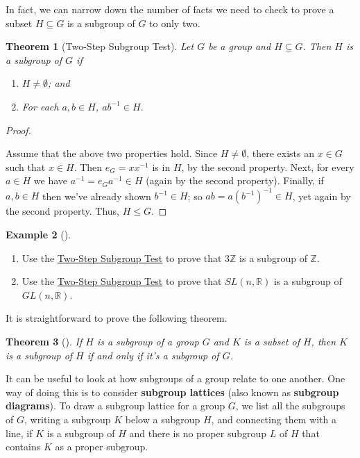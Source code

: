 \documentclass[10pt,]{book}
\newcommand{\terminology}[1]{\textbf{#1}}
\theoremstyle{plain}
\newtheorem{theorem}{Theorem}[section]
\theoremstyle{definition}
\theoremstyle{definition}
\theoremstyle{definition}
\newtheorem{example}[theorem]{Example}
\theoremstyle{definition}
\numberwithin{equation}{section}
\def\Z{\mathbb{Z}}
\def\R{\mathbb{R}}
\begin{document}
In fact, we can narrow down the number of facts we need to check to prove a subset \(H\subseteq G\) is a subgroup of \(G\) to only two.%
\begin{theorem}[{Two-Step Subgroup Test}]\label{twostep}
Let \(G\) be a group and \(H\subseteq G\). Then \(H\) is a subgroup of \(G\) if \leavevmode%
\begin{enumerate}
\item\hypertarget{li-209}{}\(H\neq \emptyset\); and%
\item\hypertarget{li-210}{}For each \(a,b\in H\), \(ab^{-1}\in H\).%
\end{enumerate}
%
\end{theorem}
\begin{proof}\hypertarget{proof-20}{}
Assume that the above two properties hold. Since \(H\neq
\emptyset\), there exists an \(x\in G\) such that \(x\in H\). Then \(e_G=xx^{-1}\) is in \(H\), by the second property. Next, for every \(a\in H\) we have \(a^{-1}=e_Ga^{-1}\in H\) (again by the second property). Finally, if \(a,b\in H\) then we've already shown \(b^{-1}\in H\); so \(ab=a(b^{-1})^{-1}\in H\), yet again by the second property. Thus, \(H\leq G\).%
\end{proof}
\begin{example}[]\label{example-38}
\leavevmode%
\begin{enumerate}
\item\hypertarget{li-211}{}Use the \hyperref[twostep]{Two-Step Subgroup Test} to prove that \(3\Z\) is a subgroup of \(\Z\).%
\item\hypertarget{li-212}{}Use the \hyperref[twostep]{Two-Step Subgroup Test} to prove that \(SL(n,\R)\) is a subgroup of \(GL(n,\R)\).%
\end{enumerate}
%
\end{example}
It is straightforward to prove the following theorem.%
\begin{theorem}[{}]\label{theorem-20}
If \(H\) is a subgroup of a group \(G\) and \(K\) is a subset of \(H\), then \(K\) is a subgroup of \(H\) if and only if it's a subgroup of \(G\).%
\end{theorem}
It can be useful to look at how subgroups of a group relate to one another. One way of doing this is to consider \terminology{subgroup lattices} (also known as \terminology{subgroup diagrams}). To draw a subgroup lattice for a group \(G\), we list all the subgroups of \(G\), writing a subgroup \(K\) below a subgroup \(H\), and connecting them with a line, if \(K\) is a subgroup of \(H\) and there is no proper subgroup \(L\) of \(H\) that contains \(K\) as a proper subgroup.%
\end{document}
